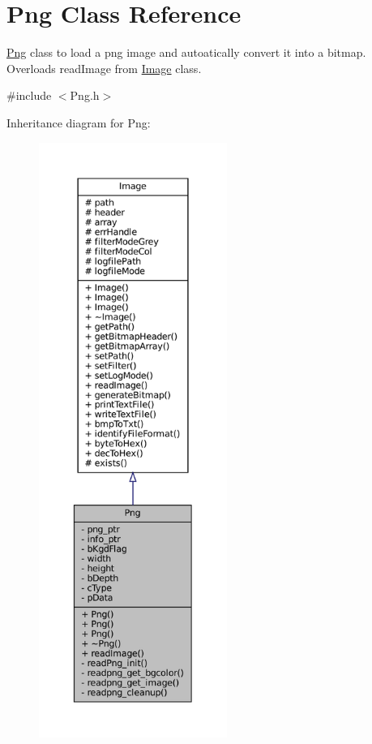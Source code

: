 \hypertarget{classPng}{}\section{Png Class Reference}
\label{classPng}


\mbox{\hyperlink{classPng}{Png}} class to load a png image and autoatically convert it into a bitmap. Overloads read\+Image from \mbox{\hyperlink{classImage}{Image}} class.  




{\ttfamily \#include $<$Png.\+h$>$}



Inheritance diagram for Png\+:
\nopagebreak
\begin{figure}[H]
\begin{center}
\leavevmode
\includegraphics[height=550pt]{classPng__inherit__graph}
\end{center}
\end{figure}



